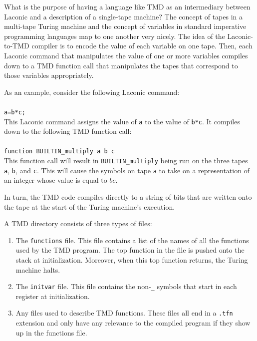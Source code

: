 \documentclass[11pt]{article}
\begin{document}
What is the purpose of having a language like TMD as an intermediary between Laconic and a description of a single-tape machine? The concept of tapes in a multi-tape Turing machine and the concept of variables in standard imperative programming languages map to one another very nicely. The idea of the Laconic-to-TMD compiler is to encode the value of each variable on one tape. Then, each Laconic command that manipulates the value of one or more variables compiles down to a TMD function call that manipulates the tapes that correspond to those variables appropriately. 

As an example, consider the following Laconic command: \\ \\
\texttt{a=b*c;} \\

This Laconic command assigns the value of \texttt{a} to the value of \texttt{b*c}. It compiles down to the following TMD function call: \\ \\
\texttt{function BUILTIN\_multiply a b c} \\

This function call will result in \texttt{BUILTIN\_multiply} being run on the three tapes \texttt{a}, \texttt{b}, and \texttt{c}. This will cause the symbols on tape \texttt{a} to take on a representation of an integer whose value is equal to $bc$.

In turn, the TMD code compiles directly to a string of bits that are written onto the tape at the start of the Turing machine's execution.

A TMD directory consists of three types of files:

\begin{enumerate}
\item The \texttt{functions} file. This file contains a list of the names of all the functions used by the TMD program. The top function in the file is pushed onto the stack at initialization. Moreover, when this top function returns, the Turing machine halts.
\item The \texttt{initvar} file. This file contains the non-\texttt{\_} symbols that start in each register at initialization. 
\item Any files used to describe TMD functions. These files all end in a \texttt{.tfn} extension and only have any relevance to the compiled program if they show up in the functions file.
\end{enumerate}
\end{document}
